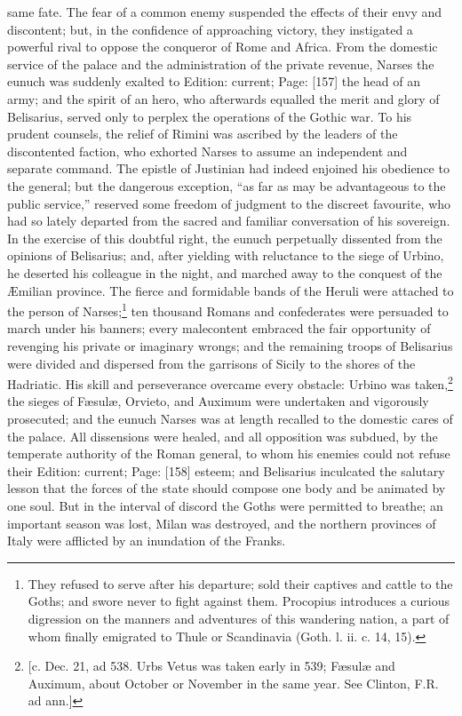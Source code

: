 same fate. The fear of a common enemy suspended the effects of their envy and discontent; but, in the confidence of approaching victory, they instigated a powerful rival to oppose the conqueror of Rome and Africa. From the domestic service of the palace and the administration of the private revenue, Narses the eunuch was suddenly exalted to Edition: current; Page: [157] the head of an army; and the spirit of an hero, who afterwards equalled the merit and glory of Belisarius, served only to perplex the operations of the Gothic war. To his prudent counsels, the relief of Rimini was ascribed by the leaders of the discontented faction, who exhorted Narses to assume an independent and separate command. The epistle of Justinian had indeed enjoined his obedience to the general; but the dangerous exception, \texthebrew{“}as far as may be advantageous to the public service,\texthebrew{}” reserved some freedom of judgment to the discreet favourite, who had so lately departed from the sacred and familiar conversation of his sovereign. In the exercise of this doubtful right, the eunuch perpetually dissented from the opinions of Belisarius; and, after yielding with reluctance to the siege of Urbino, he deserted his colleague in the night, and marched away to the conquest of the Æmilian province. The fierce and formidable bands of the Heruli were attached to the person of Narses;\footnote{They refused to serve after his departure; sold their captives and cattle to the Goths; and swore never to fight against them. Procopius introduces a curious digression on the manners and adventures of this wandering nation, a part of whom finally emigrated to Thule or Scandinavia (Goth. l. ii. c. 14, 15).} ten thousand Romans and confederates were persuaded to march under his banners; every malecontent embraced the fair opportunity of revenging his private or imaginary wrongs; and the remaining troops of Belisarius were divided and dispersed from the garrisons of Sicily to the shores of the Hadriatic. His skill and perseverance overcame every obstacle: Urbino was taken,\footnote{[c. Dec. 21, ad 538. Urbs Vetus was taken early in 539; Fæsulæ and Auximum, about October or November in the same year. See Clinton, F.R. ad ann.]} the sieges of Fæsulæ, Orvieto, and Auximum were undertaken and vigorously prosecuted; and the eunuch Narses was at length recalled to the domestic cares of the palace. All dissensions were healed, and all opposition was subdued, by the temperate authority of the Roman general, to whom his enemies could not refuse their Edition: current; Page: [158] esteem; and Belisarius inculcated the salutary lesson that the forces of the state should compose one body and be animated by one soul. But in the interval of discord the Goths were permitted to breathe; an important season was lost, Milan was destroyed, and the northern provinces of Italy were afflicted by an inundation of the Franks.


